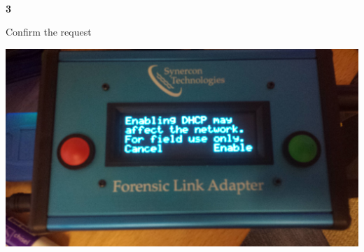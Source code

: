 \documentclass[11pt, oneside]{book}
\begin{document}
\\[\baselineskip]
\noindent\begin{minipage}{0.45\textwidth}%
\begin{center}
\textbf{3}\\[\baselineskip]
\end{center}
Confirm the request
\end{minipage}%
\hfill%
\begin{minipage}{0.45\textwidth}
\includegraphics[width=\linewidth]{../media/fla_screens/sys_conf_dhcp_conf_enable}
\end{minipage}
\end{document}
